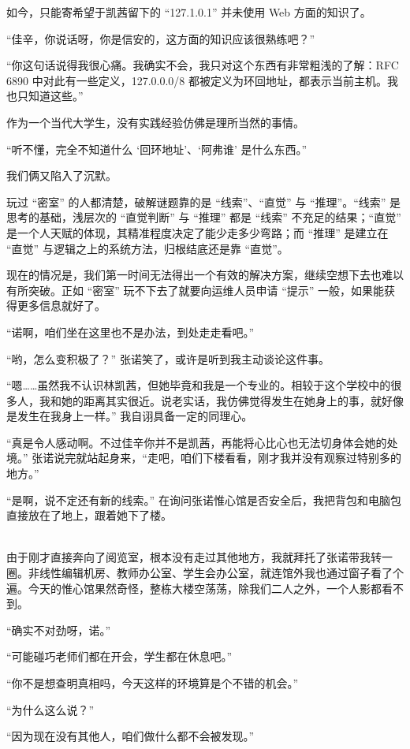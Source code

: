 \documentclass[UTF8]{ctexart}
\begin{document}
如今，只能寄希望于凯茜留下的 “127.1.0.1” 并未使用 Web 方面的知识了。

“佳辛，你说话呀，你是信安的，这方面的知识应该很熟练吧？”

“你这句话说得我很心痛。我确实不会，我只对这个东西有非常粗浅的了解：RFC 6890 中对此有一些定义，127.0.0.0/8 都被定义为环回地址，都表示当前主机。我也只知道这些。”

作为一个当代大学生，没有实践经验仿佛是理所当然的事情。

“听不懂，完全不知道什么 ‘回环地址’、‘阿弗谁’ 是什么东西。”

我们俩又陷入了沉默。

玩过 “密室” 的人都清楚，破解谜题靠的是 “线索”、“直觉” 与 “推理”。“线索” 是思考的基础，浅层次的 “直觉判断” 与 “推理” 都是 “线索” 不充足的结果；“直觉” 是一个人天赋的体现，其精准程度决定了能少走多少弯路；而 “推理” 是建立在 “直觉” 与逻辑之上的系统方法，归根结底还是靠 “直觉”。

现在的情况是，我们第一时间无法得出一个有效的解决方案，继续空想下去也难以有所突破。正如 “密室” 玩不下去了就要向运维人员申请 “提示” 一般，如果能获得更多信息就好了。

“诺啊，咱们坐在这里也不是办法，到处走走看吧。”

“哟，怎么变积极了？” 张诺笑了，或许是听到我主动谈论这件事。

“嗯……虽然我不认识林凯茜，但她毕竟和我是一个专业的。相较于这个学校中的很多人，我和她的距离其实很近。说老实话，我仿佛觉得发生在她身上的事，就好像是发生在我身上一样。” 我自诩具备一定的同理心。

“真是令人感动啊。不过佳辛你并不是凯茜，再能将心比心也无法切身体会她的处境。” 张诺说完就站起身来，“走吧，咱们下楼看看，刚才我并没有观察过特别多的地方。”

“是啊，说不定还有新的线索。” 在询问张诺惟心馆是否安全后，我把背包和电脑包直接放在了地上，跟着她下了楼。

~\\

由于刚才直接奔向了阅览室，根本没有走过其他地方，我就拜托了张诺带我转一圈。非线性编辑机房、教师办公室、学生会办公室，就连馆外我也通过窗子看了个遍。今天的惟心馆果然奇怪，整栋大楼空荡荡，除我们二人之外，一个人影都看不到。

“确实不对劲呀，诺。”

“可能碰巧老师们都在开会，学生都在休息吧。”

“你不是想查明真相吗，今天这样的环境算是个不错的机会。”

“为什么这么说？”

“因为现在没有其他人，咱们做什么都不会被发现。”
\end{document}
